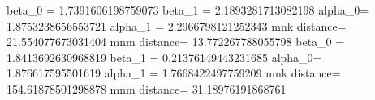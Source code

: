  beta_0 = 1.7391606198759073 beta_1 = 2.1893281713082198 alpha_0= 1.8753238656553721 alpha_1 = 2.2966798121252343 mnk distance= 21.554077673031404 mnm distance= 13.772267788055798 beta_0 = 1.8413692630968819 beta_1 = 0.21376149443231685 alpha_0= 1.876617595501619 alpha_1 = 1.7668422497759209 mnk distance= 154.61878501298878 mnm distance= 31.18976191868761